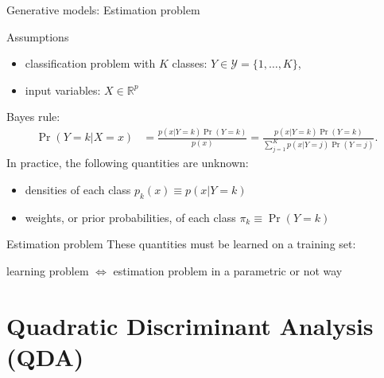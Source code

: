 \documentclass[compress, smaller, serif, 9pt]{beamer}
\begin{document}
\begin{frame}{Generative models: Estimation problem}
\begin{block}{Assumptions}
 \begin{itemize}
  \item classification problem with $K$ classes: $Y \in \mathcal{Y}=\{1,\ldots,K\}$,
  \item input variables: $X \in \mathbb{R}^p$
 \end{itemize}
\end{block}
 Bayes rule:
  \begin{align*}
  \Pr{(Y=k|X=x)} &= \frac{p(x| Y=k) \Pr{(Y=k)} } {p(x)}=  \frac{p(x| Y=k) \Pr{(Y=k)} } { \sum_{j=1}^K p(x|Y=j) \Pr{(Y=j)}  }.
 \end{align*}
 In practice, the following quantities are unknown:
 \begin{itemize}
  \item densities of each class $p_k(x) \equiv p(x| Y=k)$
  \item weights, or prior probabilities, of  each class  $\pi_k \equiv \Pr{(Y=k)}$
 \end{itemize}

\begin{block}{Estimation problem}
 These quantities must be learned on a training set:\\
 \begin{center}
  {learning problem \alert{ $\Leftrightarrow$ estimation problem} in a parametric or not way }
 \end{center}

\end{block}

\end{frame}


\section{Quadratic Discriminant Analysis (QDA)}
\end{document}
